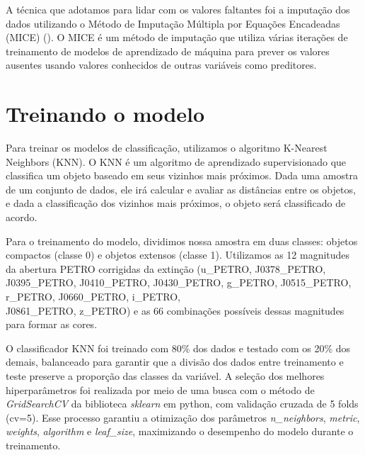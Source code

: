 \vspace{\baselineskip}

A técnica que adotamos para lidar com os valores faltantes foi a imputação dos dados utilizando o Método de Imputação Múltipla por Equações Encadeadas (MICE) (\citealp{MICE}). O MICE é um método de imputação que utiliza várias iterações de treinamento de modelos de aprendizado de máquina para prever os valores ausentes usando valores conhecidos de outras variáveis como preditores.

\section{Treinando o modelo}
Para treinar os modelos de classificação, utilizamos o algoritmo K-Nearest Neighbors (KNN). O KNN é um algoritmo de aprendizado supervisionado que classifica um objeto baseado em seus vizinhos mais próximos. Dada uma amostra de um conjunto de dados, ele irá calcular e avaliar as distâncias entre os objetos, e dada a classificação dos vizinhos mais próximos, o objeto será classificado de acordo.

\vspace{\baselineskip}

Para o treinamento do modelo, dividimos nossa amostra em duas classes: objetos compactos (classe 0) e objetos extensos (classe 1). Utilizamos as 12 magnitudes da abertura PETRO corrigidas da extinção (u\_PETRO, J0378\_PETRO, J0395\_PETRO, J0410\_PETRO, J0430\_PETRO, g\_PETRO, J0515\_PETRO, r\_PETRO, J0660\_PETRO, i\_PETRO, \\J0861\_PETRO, z\_PETRO) e as 66 combinações possíveis dessas magnitudes para formar as cores.

\vspace{\baselineskip}

O classificador KNN foi treinado com 80\% dos dados e testado com os 20\% dos demais, balanceado para garantir que a divisão dos dados entre treinamento e teste preserve a proporção das classes da variável. A seleção dos melhores hiperparâmetros foi realizada por meio de uma busca com o método de \textit{GridSearchCV} da biblioteca \textit{sklearn} em python, com validação cruzada de 5 folds (cv=5). Esse processo garantiu a otimização dos parâmetros \textit{n\_neighbors}, \textit{metric}, \textit{weights}, \textit{algorithm} e \textit{leaf\_size}, maximizando o desempenho do modelo durante o treinamento.

\vspace{\baselineskip}

